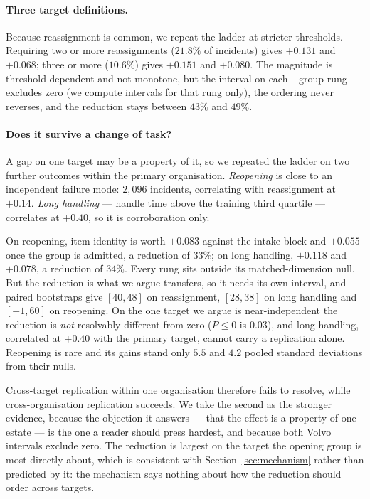 \documentclass[preprint,12pt]{elsarticle}
\begin{document}
\paragraph{Three target definitions.}
Because reassignment is common, we repeat the ladder at stricter
thresholds. Requiring two or more reassignments ($21.8\%$ of incidents)
gives $+0.131$ and $+0.068$; three or more ($10.6\%$) gives $+0.151$ and
$+0.080$. The magnitude is threshold-dependent and not monotone, but the interval on
each $+$group rung excludes zero (we compute intervals for that rung only),
the ordering never reverses, and the reduction stays between $43\%$ and
$49\%$.

\paragraph{Does it survive a change of task?}
A gap on one target may be a property of it, so we repeated the ladder on two
further outcomes within the primary organisation. \emph{Reopening} is close
to an independent failure mode: $2{,}096$ incidents, correlating with
reassignment at $+0.14$. \emph{Long handling} --- handle time above the
training third quartile --- correlates at $+0.40$, so it is corroboration
only.

On reopening, item identity is worth $+0.083$ against the intake block and
$+0.055$ once the group is admitted, a reduction of $33\%$; on long handling,
$+0.118$ and $+0.078$, a reduction of $34\%$. Every rung sits outside its
matched-dimension null. But the reduction is what we argue transfers, so it
needs its own interval, and paired bootstraps give $[40,48]$ on reassignment,
$[28,38]$ on long handling and $[-1,60]$ on reopening. On the one target we
argue is near-independent the reduction is \emph{not} resolvably different
from zero ($P \le 0$ is $0.03$), and long handling, correlated at $+0.40$
with the primary target, cannot carry a replication alone. Reopening is rare
and its gains stand only $5.5$ and $4.2$ pooled standard deviations from
their nulls.

Cross-target replication within one organisation therefore fails to
resolve, while cross-organisation replication succeeds. We take the second
as the stronger evidence, because the objection it answers
--- that the effect is a property of one estate --- is the one a reader
should press hardest, and because both Volvo intervals exclude zero. The
reduction is largest on the target the opening group is most directly about,
which is consistent with Section~\ref{sec:mechanism} rather than predicted by
it: the mechanism says nothing about how the reduction should order across
targets.
\end{document}
